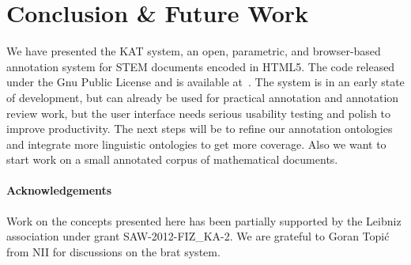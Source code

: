 \documentclass{llncs}
\def\KAT{\textsf{KAT}\xspace}
\begin{document}
\section{Conclusion \& Future Work}\label{sec:concl}

We have presented the \KAT system, an open, parametric, and browser-based annotation
system for STEM documents encoded in HTML5.  The code released under the Gnu Public
License and is available at~\cite{KAT:github:on}. The system is in an early state of
development, but can already be used for practical annotation and annotation review work,
but the user interface needs serious usability testing and polish to improve productivity.
The next steps will be to refine our annotation ontologies and integrate more linguistic
ontologies to get more coverage. Also we want to start work on a small annotated corpus of
mathematical documents. 

\paragraph{Acknowledgements} Work on the concepts presented here has been partially
supported by the Leibniz association under grant SAW-2012-FIZ\_KA-2. We are grateful to
Goran Topi\'c from NII for discussions on the brat system.

\printbibliography
\end{document}
